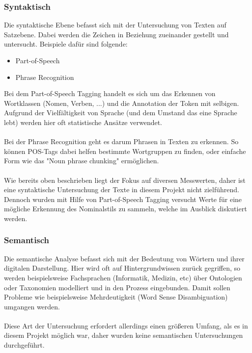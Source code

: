 \subsubsection{Syntaktisch}
Die syntaktische Ebene befasst sich mit der Untersuchung von Texten auf Satzebene. Dabei werden die Zeichen in Beziehung zueinander gestellt und untersucht. Beispiele daf\"ur sind folgende:
\begin{itemize}
\item Part-of-Speech
\item Phrase Recognition
\end{itemize}
Bei dem Part-of-Speech Tagging handelt es sich um das Erkennen von Wortklassen (Nomen, Verben, ...) und die Annotation der Token mit selbigen. Aufgrund der Vielf\"altigkeit von Sprache (und dem Umstand das eine Sprache lebt) werden hier oft statistische Ans\"atze verwendet.\\ 
\\
Bei der Phrase Recognition geht es darum Phrasen in Texten zu erkennen. So k\"onnen POS-Tags dabei helfen bestimmte Wortgruppen zu finden, oder einfache Form wie das "Noun phrase chunking" erm\"oglichen.\\
\\
Wie bereits oben beschrieben liegt der Fokus auf diversen Messwerten, daher ist eine syntaktische Untersuchung der Texte in diesem Projekt nicht zielf\"uhrend. Dennoch wurden mit Hilfe von Part-of-Speech Tagging versucht Werte für eine m\"ogliche Erkennung des Nominalstils zu sammeln, welche im Ausblick diskutiert werden.

\subsubsection{Semantisch}
Die semantische Analyse befasst sich mit der Bedeutung von W\"ortern und ihrer digitalen Darstellung. Hier wird oft auf Hintergrundwissen zur\"uck gegriffen, so werden beispielsweise Fachsprachen (Informatik, Medizin, etc) \"uber Ontologien oder Taxonomien modelliert und in den Prozess eingebunden. Damit sollen Probleme wie beispielsweise Mehrdeutigkeit (Word Sense Disambiguation) umgangen werden. \\
\\
Diese Art der Untersuchung erfordert allerdings einen gr\"oßeren Umfang, als es in diesem Projekt m\"oglich war, daher wurden keine semantischen Untersuchungen durchgef\"uhrt.


